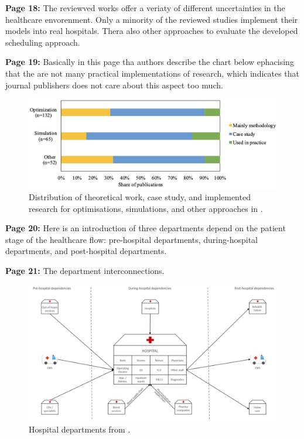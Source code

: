     \textbf{Page 18:}
    The reviewved works offer a veriaty of different uncertainties in the healthcare envorenment. Only a minority of the reviewed studies implement their models into real hospitals. Thera also other approaches to evaluate the developed scheduling approach.

    \textbf{Page 19:}
    Basically in this page tha authors describe the chart below ephacising that the are not many practical implementations of research, which indicates that journal publishers does not care about this aspect too much.
    \begin{figure}[H]
        \centering
        \includegraphics[width=1\textwidth]{figures/SR0010NL23/fig8.png}
        \caption{Distribution of theoretical work, case study, and implemented research for optimisations, simulations, and other approaches in \cite{x338}.}
        \label{fig8:SR0010NL23}
    \end{figure}
    
    \textbf{Page 20:}
    Here is an introduction of three departments depend on the patient stage of the healthcare flow: pre-hospital departments, during-hospital departments, and post-hospital departments.
    
    \textbf{Page 21:}
    The department interconnections.
    \begin{figure}[H]
        \centering
        \includegraphics[width=1\textwidth]{figures/SR0010NL23/fig9.png}
        \caption{Hospital departments from \cite{x338}.}
        \label{fig9:SR0010NL23}
    \end{figure}
    

